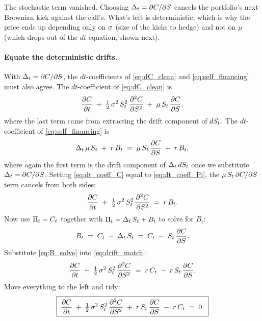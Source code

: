 \begin{intuitionbox}
The stochastic term vanished. Choosing $\Delta_t =
\partial C/\partial S$ cancels the portfolio's next
Brownian kick against the call's. What's left is deterministic,
which is why the price ends up depending only on $\sigma$
(size of the kicks to hedge) and not on $\mu$ (which drops out
of the $dt$ equation, shown next).
\end{intuitionbox}

\paragraph{Equate the deterministic drifts.}
With $\Delta_t = \partial C/\partial S$, the
$dt$-coefficients of \eqref{eq:dC_clean} and
\eqref{eq:self_financing} must also agree. The $dt$-coefficient of
\eqref{eq:dC_clean} is
\begin{equation}
  \frac{\partial C}{\partial t}
  \;+\; \tfrac{1}{2}\,\sigma^2\,S_t^2\,
        \frac{\partial^2 C}{\partial S^2}
  \;+\; \mu\,S_t\,\frac{\partial C}{\partial S},
  \label{eq:dt_coeff_C}
\end{equation}
where the last term came from extracting the drift component of
$dS_t$. The $dt$-coefficient of \eqref{eq:self_financing} is
\begin{equation}
  \Delta_t\,\mu\,S_t \;+\; r\,B_t
  \;=\; \mu\,S_t\,\frac{\partial C}{\partial S}
       \;+\; r\,B_t,
  \label{eq:dt_coeff_Pi}
\end{equation}
where again the first term is the drift component of
$\Delta_t\,dS_t$ once we substitute $\Delta_t =
\partial C/\partial S$. Setting \eqref{eq:dt_coeff_C} equal
to \eqref{eq:dt_coeff_Pi}, the $\mu\,S_t\,\partial C/
\partial S$ term cancels from both sides:
\begin{equation}
  \frac{\partial C}{\partial t}
  \;+\; \tfrac{1}{2}\,\sigma^2\,S_t^2\,
        \frac{\partial^2 C}{\partial S^2}
  \;=\; r\,B_t.
  \label{eq:drift_match}
\end{equation}
Now use $\Pi_t = C_t$ together with $\Pi_t = \Delta_t\,S_t
+ B_t$ to solve for $B_t$:
\begin{equation}
  B_t \;=\; C_t \;-\; \Delta_t\,S_t
       \;=\; C_t \;-\; S_t\,\frac{\partial C}{\partial S}.
  \label{eq:B_solve}
\end{equation}
Substitute \eqref{eq:B_solve} into \eqref{eq:drift_match}:
\begin{equation}
  \frac{\partial C}{\partial t}
  \;+\; \tfrac{1}{2}\,\sigma^2\,S_t^2\,
        \frac{\partial^2 C}{\partial S^2}
  \;=\; r\,C_t
     \;-\; r\,S_t\,\frac{\partial C}{\partial S}.
  \label{eq:pde_intermediate}
\end{equation}
Move everything to the left and tidy:
\begin{equation}
  \boxed{\;
    \frac{\partial C}{\partial t}
    \;+\; \tfrac{1}{2}\,\sigma^2\,S_t^2\,
          \frac{\partial^2 C}{\partial S^2}
    \;+\; r\,S_t\,\frac{\partial C}{\partial S}
    \;-\; r\,C_t
    \;=\; 0.
  \;}
  \label{eq:bs_pde}
\end{equation}

